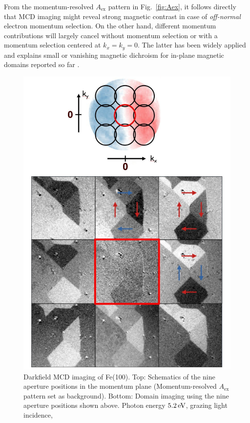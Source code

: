 \documentclass[prl,twocolumn,floatfix]{revtex4-2}
\newcommand{\rework}[1]{{\color{blue}{#1}}}
\begin{document}
From the momentum-resolved $A_{\mathrm{ex}}$ pattern in Fig.~\ref{fig:Aex}, it follows directly that MCD imaging might reveal strong magnetic contrast in case of \textit{off-normal} electron momentum selection. On the other hand, different momentum contributions will largely cancel without momentum selection or with a momentum selection centered at $k_x=k_y=0$. The latter has been widely applied and explains small or vanishing magnetic dichroism for in-plane magnetic domains reported so far \cite{marx2000}.
\begin{figure}
    \centering
    \includegraphics[width = 0.8\columnwidth]{Darkfield_overview.pdf}
    \caption{Darkfield MCD imaging of Fe(100). Top: Schematics of the nine aperture positions in the momentum plane (Momentum-resolved $A_{\mathrm{ex}}$ pattern set as background). Bottom: Domain imaging using the nine aperture positions shown above. Photon energy $\unit[5.2]{eV}$, grazing light incidence, \rework{binding energy $\unit[xx]{eV}$.}}
    \label{fig:Imaging}
\end{figure}
\end{document}
